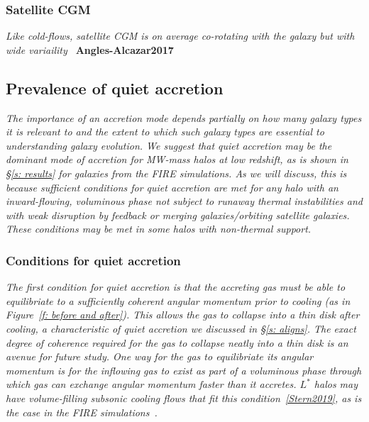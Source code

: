 \documentclass[fleqn,usenatbib]{mnras}
\begin{document}
\subsubsection{Satellite CGM}

\textit{
Like cold-flows, satellite CGM is on average co-rotating with the galaxy but with wide variaility~\citep[e.g.][]{stewartOrbitingCircumgalacticGas2011, hafenOriginsCircumgalacticMedium2019}
}
\textbf{Angles-Alcazar2017}

\subsection{Prevalence of quiet accretion}
\label{s: prevalence}

\textit{
The importance of  an accretion mode depends partially on how many galaxy types it is relevant to and the extent to which such galaxy types are essential to understanding galaxy evolution.
We suggest that quiet accretion may be the dominant mode of accretion for MW-mass halos at low redshift, as is shown in \S\ref{s: results} for galaxies from the FIRE simulations.
As we will discuss, this is because sufficient conditions for quiet accretion are met for any halo with an inward-flowing, voluminous phase not subject to runaway thermal instabilities and with weak disruption by feedback or merging galaxies/orbiting satellite galaxies.
These conditions may be met in some halos with non-thermal support.
}

\subsubsection{Conditions for quiet accretion}

\textit{
The first condition for quiet accretion is that the accreting gas must be able to equilibriate to a sufficiently coherent angular momentum prior to cooling (as in Figure~\ref{f: before and after}).
This allows the gas to collapse into a thin disk after cooling, a characteristic of quiet accretion we discussed in \S\ref{s: aligns}.
The exact degree of coherence required for the gas to collapse neatly into a thin disk is an avenue for future study.
One way for the gas to equilibriate its angular momentum is for the inflowing gas to exist as part of a voluminous phase through which gas can exchange angular momentum faster than it accretes.
$L^*$ halos may have volume-filling subsonic cooling flows that fit this condition~\ref{Stern2019}, as is the case in the FIRE simulations~\citep{Stern2020}.
}
\end{document}
